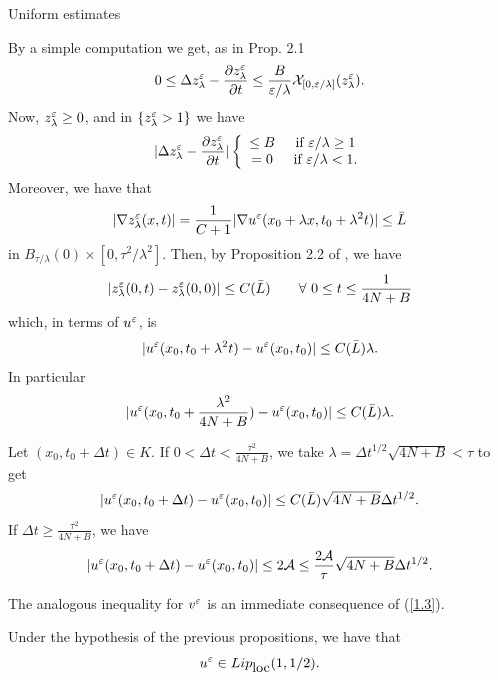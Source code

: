 \begin{section}{Uniform estimates}
\begin{pf}
By a simple computation we get, as in Prop. 2.1
$$0\le \Delta z^{\varepsilon}_{\lambda} - \frac{\partial z^{\varepsilon}_{\lambda}}{\partial t}
\le\frac{B}{\varepsilon/\lambda}{\cal X}_{[0,\varepsilon/\lambda]}(z^{\varepsilon}_{\lambda}).$$
Now, $z^{\varepsilon}_{\lambda}\ge0$, and in $\{ z^{\varepsilon}_{\lambda}>1 \}$ we have
$$|\Delta z^{\varepsilon}_{\lambda} - \frac{\partial z^{\varepsilon}_{\lambda}}{\partial t}|
\left\{\begin{array}{cc}
		\le B & \mbox{ if } \varepsilon/\lambda\ge1\\
		= 0   & \mbox{ if } \varepsilon/\lambda<1.\\
	\end{array}\right.$$
Moreover, we have that
$$|\nabla z_{\lambda}^{\varepsilon}(x,t)|=
\frac1{C+1}|\nabla u^{\varepsilon}(x_0+\lambda x,t_0+\lambda^2 t)|\le \bar L$$
in $B_{\tau/\lambda}(0)\times[0,\tau^2/\lambda^2]$.
Then, by Proposition 2.2 of \cite{CLW1}, we have
$$|z^{\varepsilon}_{\lambda}(0,t)-z^{\varepsilon}_{\lambda}(0,0)|\le C(\bar L)\qquad
\forall\ 0\le t\le\frac{1}{4N+B}$$
which, in terms of $u^{\varepsilon}$, is
$$|u^{\varepsilon}(x_0,t_0+\lambda^2 t)-u^{\varepsilon}(x_0,t_0)|\le C(\bar L)\lambda.$$
In particular
$$|u^{\varepsilon}(x_0,t_0+\frac{\lambda^2}{4N+B})-u^{\varepsilon}(x_0,t_0)|\le C(\bar L)\lambda.$$

Let $(x_0,t_0+\Delta t)\in K$. If $0<\Delta t<\frac{\tau^2}{4N+B}$, we take
$\lambda=\Delta t^{1/2}\sqrt{4N+B}<\tau$ to get
$$|u^{\varepsilon}(x_0,t_0+\Delta t)-u^{\varepsilon}(x_0,t_0)|\le C(\bar L)\sqrt{4N+B}
\Delta t^{1/2}.$$
If $\Delta t\ge\frac{\tau^2}{4N+B}$, we have
$$|u^{\varepsilon}(x_0,t_0+\Delta t)-u^{\varepsilon}(x_0,t_0)|\le 2{\cal A}\le
\frac{2{\cal A}}{\tau}\sqrt{4N+B}\Delta t^{1/2}.$$

The analogous inequality for $v^{\varepsilon}$ is an immediate consequence of 
(\ref{1.3}).\end{pf}

\medskip

\begin{rem} Under the hypothesis of the previous propositions, 
we have that 
$$u^{\varepsilon}\in Lip_{\mbox{loc}}(1,1/2).$$
\end{rem}

\medskip


\end{section}
